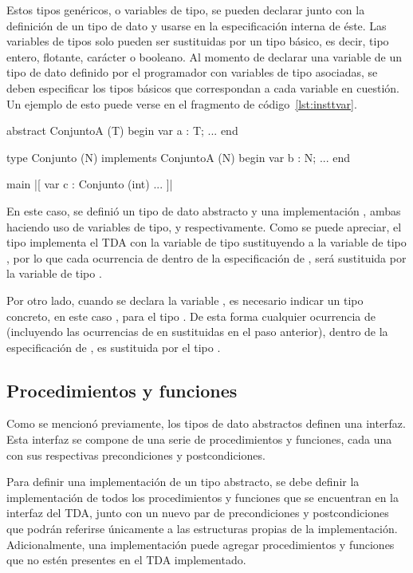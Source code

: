 {{Estos tipos genéricos, o variables de tipo, se pueden declarar junto con la
definición de un tipo de dato y usarse en la especificación interna de éste. Las
variables de tipos solo pueden ser sustituidas por un tipo básico, es decir,
tipo entero, flotante, carácter o booleano. Al momento de
declarar una variable de un tipo de dato definido por el programador con
variables de tipo asociadas, se deben  especificar los tipos básicos que
correspondan a cada variable en cuestión. Un ejemplo de esto puede verse en el
fragmento de código~\ref{lst:insttvar}.

\begin{gracielacode}[caption=Instanciación de variables de tipo, label=lst:insttvar]
abstract ConjuntoA (T) begin
  var a : T;
  ...
end

type Conjunto (N) implements ConjuntoA (N) begin
  var b : N;
  ...
end

main
 |[ var c : Conjunto (int)
    ...
 ]|
\end{gracielacode}

En este caso, se definió un tipo de dato abstracto  y una
implementación , ambas haciendo uso de variables de tipo,
 y  respectivamente. Como se puede apreciar, el tipo
 implementa el TDA  con la variable de tipo
 sustituyendo a la variable de tipo , por lo que cada
ocurrencia de  dentro de la especificación de , será
sustituida por la variable de tipo .

Por otro lado, cuando se declara la variable , es necesario indicar un
tipo concreto, en este caso , para el tipo . De
esta forma cualquier ocurrencia de  (incluyendo las ocurrencias de
 en  sustituidas en el paso anterior), dentro de la
especificación de , es sustituida por el tipo .

\subsection{Procedimientos y funciones}

Como se mencionó previamente, los tipos de dato abstractos definen una
interfaz. Esta interfaz se compone de una serie de procedimientos y funciones,
cada una con sus respectivas precondiciones y postcondiciones.

Para definir una implementación de un tipo abstracto, se debe definir la
implementación de todos los procedimientos y funciones que se encuentran en la
interfaz del TDA, junto con un nuevo par de precondiciones y postcondiciones que
podrán referirse únicamente a las estructuras propias de la implementación.
Adicionalmente, una implementación puede agregar procedimientos y funciones que
no estén presentes en el TDA implementado.

}}
